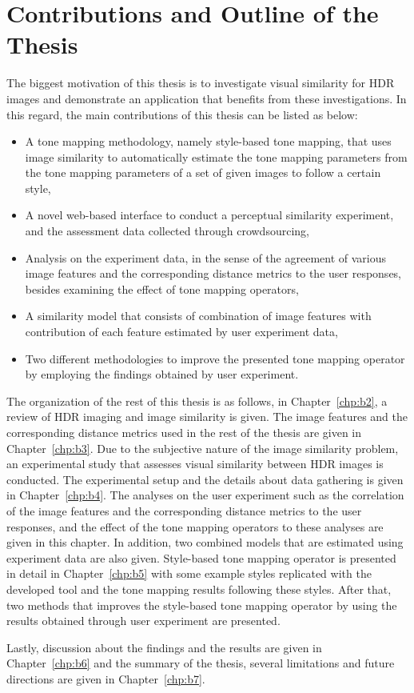 \section{Contributions and Outline of the Thesis}
The biggest motivation of this thesis is to investigate visual similarity for HDR images and demonstrate an application that benefits from these investigations. In this regard, the main contributions of this thesis can be listed as below: 
\begin{itemize}
    \item A tone mapping methodology, namely style-based tone mapping, that uses image similarity to automatically estimate the tone mapping parameters from the tone mapping parameters of a set of given images to follow a certain style,
    \item A novel web-based interface to conduct a perceptual similarity experiment, and the assessment data collected through crowdsourcing,
    \item Analysis on the experiment data, in the sense of the agreement of various image features and the corresponding distance metrics to the user responses, besides examining the effect of tone mapping operators,
    \item A similarity model that consists of combination of image features with contribution of each feature estimated by user experiment data,
    \item Two different methodologies to improve the presented tone mapping operator by employing the findings obtained by user experiment.
\end{itemize}


The organization of the rest of this thesis is as follows, in Chapter~\ref{chp:b2}, a review of HDR imaging and image similarity is given. The image features and the corresponding distance metrics used in the rest of the thesis are given in Chapter~\ref{chp:b3}. Due to the subjective nature of the image similarity problem, an experimental study that assesses visual similarity between HDR images is conducted. The experimental setup and the details about data gathering is given in Chapter~\ref{chp:b4}. The analyses on the user experiment such as the correlation of the image features and the corresponding distance metrics to the user responses, and the effect of the tone mapping operators to these analyses are given in this chapter. In addition, two combined models that are estimated using experiment data are also given. Style-based tone mapping operator is presented in detail in Chapter~\ref{chp:b5} with some example styles replicated with the developed tool and the tone mapping results following these styles. After that, two methods that improves the style-based tone mapping operator by using the results obtained through user experiment are presented. 

Lastly, discussion about the findings and the results are given in Chapter~\ref{chp:b6} and the summary of the thesis, several limitations and future directions are given in Chapter~\ref{chp:b7}.






